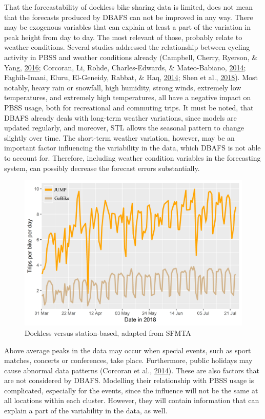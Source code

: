 \documentclass[12pt,oneside]{reedthesis}
\begin{document}
That the forecastability of dockless bike sharing data is limited, does
not mean that the forecasts produced by DBAFS can not be improved in any
way. There may be exogenous variables that can explain at least a part
of the variation in peak height from day to day. The most relevant of
those, probably relate to weather conditions. Several studies addressed
the relationship between cycling activity in PBSS and weather conditions
already (Campbell, Cherry, Ryerson, \& Yang,
\protect\hyperlink{ref-campbell2016}{2016}; Corcoran, Li, Rohde,
Charles-Edwards, \& Mateo-Babiano,
\protect\hyperlink{ref-corcoran2014}{2014}; Faghih-Imani, Eluru,
El-Geneidy, Rabbat, \& Haq, \protect\hyperlink{ref-faghih2014}{2014};
Shen et al., \protect\hyperlink{ref-shen2018}{2018}). Most notably,
heavy rain or snowfall, high humidity, strong winds, extremely low
temperatures, and extremely high temperatures, all have a negative
impact on PBSS usage, both for recreational and commuting trips. It must
be noted, that DBAFS already deals with long-term weather variations,
since models are updated regularly, and moreover, STL allows the
seasonal pattern to change slightly over time. The short-term weather
variation, however, may be an important factor influencing the
variability in the data, which DBAFS is not able to account for.
Therefore, including weather condition variables in the forecasting
system, can possibly decrease the forecast errors substantially.
\begin{figure}[H]
\includegraphics[width=\textwidth]{Figures/jumpgo} \caption{Dockless versus station-based, adapted from SFMTA}\label{fig:jumpgo}
\end{figure}
Above average peaks in the data may occur when special events, such as
sport matches, concerts or conferences, take place. Furthermore, public
holidays may cause abnormal data patterns (Corcoran et al.,
\protect\hyperlink{ref-corcoran2014}{2014}). These are also factors that
are not considered by DBAFS. Modelling their relationship with PBSS
usage is complicated, especially for the events, since the influence
will not be the same at all locations within each cluster. However, they
will contain information that can explain a part of the variability in
the data, as well.
\end{document}
